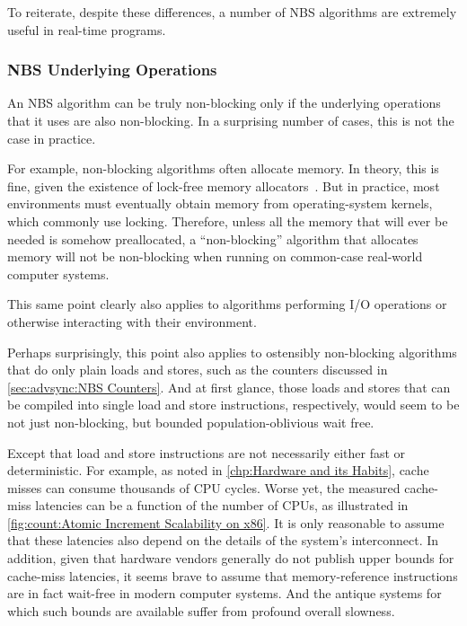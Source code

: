 To reiterate, despite these differences, a number of NBS algorithms are
extremely useful in real-time programs.

\subsubsection{NBS Underlying Operations}
\label{sec:advsync:NBS Underlying Operations}

An NBS algorithm can be truly non-blocking only if the underlying
operations that it uses are also non-blocking.
In a surprising number of cases, this is not the case in practice.

For example, non-blocking algorithms often allocate memory.
In theory, this is fine, given the existence of lock-free
memory allocators~\cite{MagedMichael04NBSmalloc}.
But in practice, most environments must eventually obtain memory from
operating-system kernels, which commonly use locking.
Therefore, unless all the memory that will ever be needed is somehow
preallocated, a ``non-blocking'' algorithm that allocates memory will not
be non-blocking when running on common-case real-world computer systems.

This same point clearly also applies to algorithms performing I/O
operations or otherwise interacting with their environment.

Perhaps surprisingly, this point also applies to ostensibly non-blocking
algorithms that do only plain loads and stores, such as the counters
discussed in \cref{sec:advsync:NBS Counters}.
And at first glance, those loads and stores that can be compiled into
single load and store instructions, respectively, would seem to be
not just non-blocking, but bounded population-oblivious wait free.

Except that load and store instructions are not necessarily either
fast or deterministic.
For example, as noted in \cref{chp:Hardware and its Habits}, cache misses
can consume thousands of CPU cycles.
Worse yet, the measured cache-miss latencies can be a function of the
number of CPUs, as illustrated in
\cref{fig:count:Atomic Increment Scalability on x86}.
It is only reasonable to assume that these latencies also depend on
the details of the system's interconnect.
In addition, given that hardware vendors generally do not publish
upper bounds for cache-miss latencies, it seems brave to assume that
memory-reference instructions are in fact wait-free in modern computer
systems.
And the antique systems for which such bounds are available suffer from
profound overall slowness.

